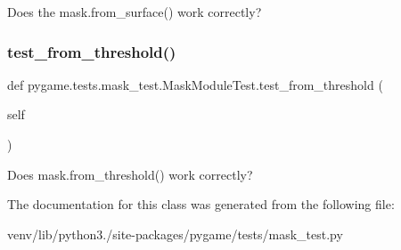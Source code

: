 \begin{DoxyVerb}Does the mask.from_surface() work correctly?
\end{DoxyVerb}
 \mbox{\label{classpygame_1_1tests_1_1mask__test_1_1_mask_module_test_a6f767869d606e7163af83972d2cd2873}} 
\subsubsection{\texorpdfstring{test\+\_\+from\+\_\+threshold()}{test\_from\_threshold()}}
{\footnotesize\ttfamily def pygame.\+tests.\+mask\+\_\+test.\+Mask\+Module\+Test.\+test\+\_\+from\+\_\+threshold (\begin{DoxyParamCaption}\item[{}]{self }\end{DoxyParamCaption})}

\begin{DoxyVerb}Does mask.from_threshold() work correctly?
\end{DoxyVerb}
 

The documentation for this class was generated from the following file\+:\begin{DoxyCompactItemize}
\item 
venv/lib/python3./site-\/packages/pygame/tests/mask\+\_\+test.\+py\end{DoxyCompactItemize}
